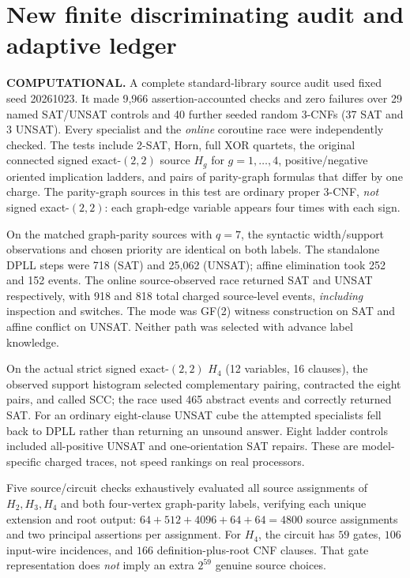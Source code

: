 \documentclass[11pt]{article}
\begin{document}
\section{New finite discriminating audit and adaptive ledger}
\textbf{COMPUTATIONAL.} A complete standard-library source audit used fixed seed 20261023. It made 9,966 assertion-accounted checks and zero failures over 29 named SAT/UNSAT controls and 40 further seeded random 3-CNFs (37 SAT and 3 UNSAT). Every specialist and the \emph{online} coroutine race were independently checked. The tests include 2-SAT, Horn, full XOR quartets, the original connected signed exact-$(2,2)$ source $H_g$ for $g=1,\ldots,4$, positive/negative oriented implication ladders, and pairs of parity-graph formulas that differ by one charge. The parity-graph sources in this test are ordinary proper 3-CNF, \emph{not} signed exact-$(2,2)$: each graph-edge variable appears four times with each sign.

On the matched graph-parity sources with $q=7$, the syntactic width/support observations and chosen priority are identical on both labels. The standalone DPLL steps were 718 (SAT) and 25,062 (UNSAT); affine elimination took 252 and 152 events. The online source-observed race returned SAT and UNSAT respectively, with 918 and 818 total charged source-level events, \emph{including} inspection and switches. The mode was GF(2) witness construction on SAT and affine conflict on UNSAT. Neither path was selected with advance label knowledge.

On the actual strict signed exact-$(2,2)$ $H_4$ (12 variables, 16 clauses), the observed support histogram selected complementary pairing, contracted the eight pairs, and called SCC; the race used 465 abstract events and correctly returned SAT. For an ordinary eight-clause UNSAT cube the attempted specialists fell back to DPLL rather than returning an unsound answer. Eight ladder controls included all-positive UNSAT and one-orientation SAT repairs. These are model-specific charged traces, not speed rankings on real processors.

Five source/circuit checks exhaustively evaluated all source assignments of $H_2,H_3,H_4$ and both four-vertex graph-parity labels, verifying each unique extension and root output: $64+512+4096+64+64=4800$ source assignments and two principal assertions per assignment. For $H_4$, the circuit has $59$ gates, $106$ input-wire incidences, and $166$ definition-plus-root CNF clauses. That gate representation does \emph{not} imply an extra $2^{59}$ genuine source choices.
\end{document}
